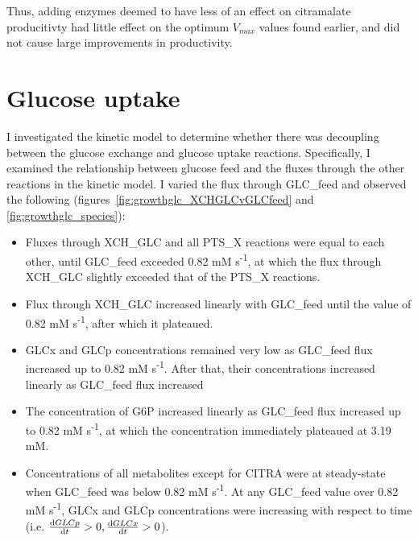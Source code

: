 \documentclass[parskip=full, numbers=noenddot]{scrreprt}
\begin{document}
Thus, adding enzymes deemed to have less of an effect on citramalate producitivty had little effect on the optimum $V_{max}$ values found earlier, and did not cause large improvements in productivity.

\section{Glucose uptake}
\label{sec:glucoseuptake}


I investigated the kinetic model to determine whether there was decoupling between the glucose exchange and glucose uptake reactions.
Specifically, I examined the relationship between glucose feed and the fluxes through the other reactions in the kinetic model. I varied the flux through GLC\_feed and observed the following (figures~\ref{fig:growthglc_XCHGLCvGLCfeed} and \ref{fig:growthglc_species}):

\begin{itemize}
\item Fluxes through XCH\_GLC and all PTS\_X reactions were equal to each other, until GLC\_feed exceeded 0.82 mM s\textsuperscript{-1}, at which the flux through XCH\_GLC slightly exceeded that of the PTS\_X reactions.
\item Flux through XCH\_GLC increased linearly with GLC\_feed until the value of 0.82 mM s\textsuperscript{-1}, after which it plateaued.
\item GLCx and GLCp concentrations remained very low as GLC\_feed flux increased up to 0.82 mM s\textsuperscript{-1}. After that, their concentrations increased linearly as GLC\_feed flux increased
\item The concentration of G6P increased linearly as GLC\_feed flux increased up to 0.82 mM s\textsuperscript{-1}, at which the concentration immediately plateaued at 3.19 mM.
  \item Concentrations of all metabolites except for CITRA were at steady-state when GLC\_feed was below 0.82 mM s\textsuperscript{-1}. At any GLC\_feed value over 0.82 mM s\textsuperscript{-1}, GLCx and GLCp concentrations were increasing with respect to time (i.e. \( \dv{GLCp}{t} > 0, \dv{GLCx}{t} > 0\)).
\end{itemize}
\end{document}
